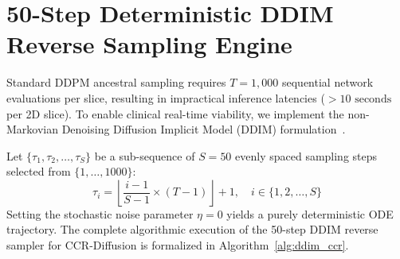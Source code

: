 \section{50-Step Deterministic DDIM Reverse Sampling Engine}
Standard DDPM ancestral sampling requires $T = 1,000$ sequential network evaluations per slice, resulting in impractical inference latencies ($> 10\text{ seconds}$ per 2D slice). To enable clinical real-time viability, we implement the non-Markovian Denoising Diffusion Implicit Model (DDIM) formulation~\cite{song2021denoising}.

Let $\{\tau_1, \tau_2, \dots, \tau_S\}$ be a sub-sequence of $S = 50$ evenly spaced sampling steps selected from $\{1, \dots, 1000\}$:
\begin{equation}
\tau_i = \left\lfloor \frac{i-1}{S-1} \times (T - 1) \right\rfloor + 1, \quad i \in \{1, 2, \dots, S\}
\label{eq:tau_subsequence}
\end{equation}
Setting the stochastic noise parameter $\eta = 0$ yields a purely deterministic ODE trajectory. The complete algorithmic execution of the 50-step DDIM reverse sampler for CCR-Diffusion is formalized in Algorithm~\ref{alg:ddim_ccr}.

